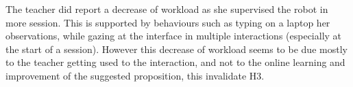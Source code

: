 The teacher did report a decrease of workload as she supervised the robot in more session. This is supported by behaviours such as typing on a laptop her observations, while gazing at the interface in multiple interactions (especially at the start of a session). However this decrease of workload seems to be due mostly to the teacher getting used to the interaction, and not to the online learning and improvement of the suggested proposition, this invalidate H3.
%
%
%
%
%
